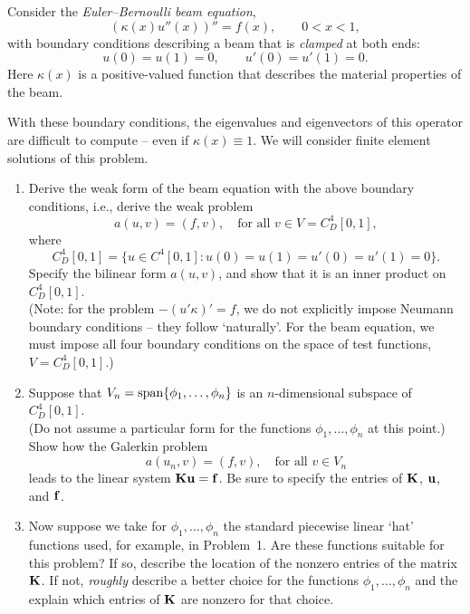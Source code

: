 Consider the \emph{Euler--Bernoulli beam equation},
\[  (\kappa(x) u''(x))'' = f(x), \qquad 0<x<1,\]
with boundary conditions describing a beam that is \emph{clamped} at both ends:
\[ u(0) = u(1) = 0, \qquad u'(0) = u'(1) = 0.\]
Here $\kappa(x)$ is a positive-valued function that describes the 
material properties of the beam.  

With these boundary conditions, the eigenvalues and eigenvectors of this operator
are difficult to compute -- even if $\kappa(x)\equiv 1$.  We will consider finite
element solutions of this problem.

\vspace*{1em}
\begin{enumerate}
\item Derive the weak form of the beam equation with the above boundary conditions,
      i.e., derive the weak problem
        \[ a(u,v) = (f,v), \quad \mbox{for all $v \in V = C^4_D[0,1]$},\]
     where
     \[C^4_D[0,1] = \{u \in C^4[0,1]: u(0)=u(1)= u'(0) = u'(1) = 0\}.\]
      Specify the bilinear form $a(u,v)$, and show that it is an inner product
      on $C^4_D[0,1]$.  \\[.25em]
    (Note: for the problem $-(u'\kappa)' = f$, we do not explicitly impose Neumann boundary
     conditions -- they follow `naturally'.  For the beam equation, we must impose all four
     boundary conditions on the space of test functions, $V = C^4_D[0,1]$.) 
     

\vspace*{1em}
\item Suppose that $V_n = {\rm span}\{\phi_1, \ldots, \phi_n\}$ 
      is an $n$-dimensional subspace of $C^4_D[0,1]$.\\
      (Do not assume a particular form for the functions
       $\phi_1, \ldots, \phi_n$ at this point.)\\
      Show how the Galerkin problem
        \[ a(u_n,v) = (f,v), \quad \mbox{for all $v \in V_n$}\]
      leads to the linear system ${\bf K}{\bf u} = {\bf f}$.  
      Be sure to specify the entries of ${\bf K}$, ${\bf u}$, and ${\bf f}$.

\vspace*{1em}
\item Now suppose we take for $\phi_1, \ldots, \phi_n$ the standard piecewise 
      linear `hat' functions used, for example, in Problem~1.
      Are these functions suitable for this problem?
      If so, describe the location of the nonzero entries of the matrix ${\bf K}$.
      If not, \emph{roughly} describe a better choice for the functions $\phi_1, \ldots, \phi_n$
      and the explain which entries of ${\bf K}$ are nonzero for that choice.
\end{enumerate}

